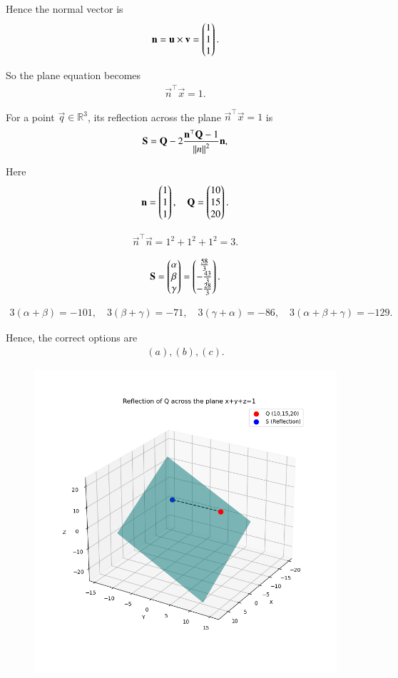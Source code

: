 \documentclass[journal]{IEEEtran}
\begin{document}
Hence the normal vector is
\begin{align}
\mathbf{n} = \mathbf{u} \times \mathbf{v} 
= \begin{pmatrix}1\\1\\1\end{pmatrix}.
\end{align}

So the plane equation becomes
\begin{align}
\vec{n}^\top\vec x = 1.
\end{align}

For a point $\vec q \in \mathbb{R}^3$, its reflection across the plane 
$\vec{n}^\top\vec{x} = 1$ is
\begin{align}
\mathbf{S} = \mathbf{Q}-2\frac{\mathbf{n}^\top\mathbf{Q}-1}{\left\lVert n\right\rVert^2}\mathbf{n},
\end{align}

Here
\begin{align}
\mathbf{n} = \begin{pmatrix}1\\1\\1\end{pmatrix},  
\quad \mathbf{Q} = \begin{pmatrix}10\\15\\20\end{pmatrix}.
\end{align}

\begin{align}
\vec{n}^\top\vec n = 1^2+1^2+1^2=3.
\end{align}


\begin{align}
\mathbf{S}=\begin{pmatrix}\alpha \\ \beta \\ \gamma\end{pmatrix} = \begin{pmatrix}\frac{58}{3} \\ -\frac{43}{3} \\ -\frac{28}{3}\end{pmatrix}.
\end{align}

\begin{align}
3(\alpha+\beta) = -101,\quad
3(\beta+\gamma) = -71,\quad
3(\gamma+\alpha) = -86,\quad
3(\alpha+\beta+\gamma) = -129.
\end{align}

Hence, the correct options are
\begin{align}
\boxed{(a), (b), (c)}.
\end{align}

\begin{figure}[H]
    \centering
    \includegraphics[width=0.8\linewidth]{figs/plot10.png}
    \caption{}
    \label{fig:placeholder}
\end{figure}
\end{document}
